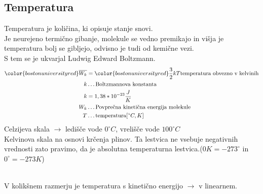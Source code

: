{\color{indiagreen}\subsection{Temperatura}}
Temperatura je količina, ki opisuje stanje snovi.\\
Je neurejeno termično gibanje, molekule se vedno premikajo in višja je temperatura bolj se gibljejo, odvisno je tudi od kemične vezi.\\
S tem se je ukvarjal Ludwig Edward Boltzmann.\\
\begin{align*}
	{\color{bostonuniversityred}\overline{W_k}} &= {\color{bostonuniversityred}\frac{3}{2}kT} \text{temperatura obvezno v kelvinih}\\ 
	k &\dots \text{Boltzmannova konstanta}\\
	k &= 1,38 * 10 ^ {-23} \frac{J}{K}\\
	W_k &\dots \text{Povprečna kinetična energija molekule}\\
	T &\dots \text{temperatura} [^{\circ} C, K]\\
\end{align*}
Celzijeva skala $\rightarrow$ ledišče vode $0^{\circ} C$, vrelišče vode $100^{\circ} C$\\
Kelvinova skala na osnovi krčenja plinov. Ta lestvica ne vsebuje negativnih vrednosti zato pravimo, da je absolutna temperaturna lestvica.($0K =-273^{\circ}$ in $0^{\circ} =-273K$)\\
\\
V kolikšnem razmerju je temperatura s kinetično energijo $\rightarrow$ v linearnem.\\
